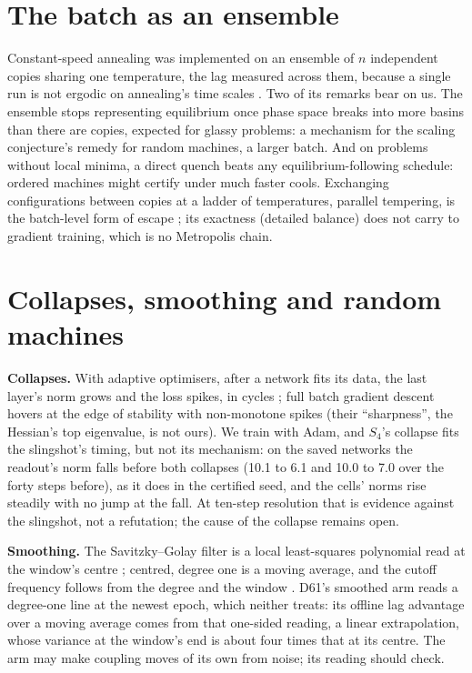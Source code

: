 \documentclass[11pt]{article}
\begin{document}
\section{The batch as an ensemble}

Constant-speed annealing was implemented on an ensemble of $n$ independent copies sharing one
temperature, the lag measured across them, because a single run is not ergodic on annealing's time
scales \citep{salamon-1988-simulated-annealing-constant-thermodynamic-speed}. Two of its remarks bear
on us. The ensemble stops representing equilibrium once phase space breaks into more basins than
there are copies, expected for glassy problems: a mechanism for the scaling conjecture's remedy for
random machines, a larger batch. And on problems without local minima, a direct quench beats any
equilibrium-following schedule: ordered machines might certify under much faster cools. Exchanging
configurations between copies at a ladder of temperatures, parallel tempering, is the batch-level
form of escape \citep{earl-2005-parallel-tempering-theory-applications}; its exactness (detailed
balance) does not carry to gradient training, which is no Metropolis chain.

\section{Collapses, smoothing and random machines}

\textbf{Collapses.} With adaptive optimisers, after a network fits its data, the last layer's norm
grows and the loss spikes, in cycles \citep{thilak-2022-slingshot-mechanism-adaptive-optimizers}; full
batch gradient descent hovers at the edge of stability with non-monotone spikes
\citep{cohen-2021-edge-of-stability-gradient-descent} (their ``sharpness'', the Hessian's top
eigenvalue, is not ours). We train with Adam, and $S_4$'s collapse fits the slingshot's timing, but not its
mechanism: on the saved networks the readout's norm falls before both collapses (10.1 to 6.1 and 10.0 to
7.0 over the forty steps before), as it does in the certified seed, and the cells' norms rise steadily
with no jump at the fall. At ten-step resolution that is evidence against the slingshot, not a
refutation; the cause of the collapse remains open.

\textbf{Smoothing.} The Savitzky--Golay filter is a local least-squares polynomial read at the
window's centre \citep{savitzky-1964-smoothing-differentiation-least-squares}; centred, degree one is a
moving average, and the cutoff frequency follows from the degree and the window
\citep{schafer-2011-what-is-savitzky-golay-filter}. D61's smoothed arm reads a degree-one line at the
newest epoch, which neither treats: its offline lag advantage over a moving average comes from that
one-sided reading, a linear extrapolation, whose variance at the window's end is about four times
that at its centre. The arm may make coupling moves of its own from noise; its reading should check.
\end{document}
